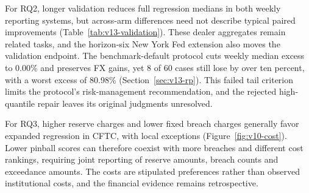 For RQ2, longer validation reduces full regression medians in both weekly reporting systems, but across-arm differences need not describe typical paired improvements (Table~\ref{tab:v13-validation}). These dealer aggregates remain related tasks, and the horizon-six New York Fed extension also moves the validation endpoint. The benchmark-default protocol cuts weekly median excess to 0.00\% and preserves FX gains, yet 8 of 60 cases still lose by over ten percent, with a worst excess of 80.98\% (Section~\ref{sec:v13-rp}). This failed tail criterion limits the protocol's risk-management recommendation, and the rejected high-quantile repair leaves its original judgments unresolved.

For RQ3, higher reserve charges and lower fixed breach charges generally favor expanded regression in CFTC, with local exceptions (Figure~\ref{fig:v10-cost}). Lower pinball scores can therefore coexist with more breaches and different cost rankings, requiring joint reporting of reserve amounts, breach counts and exceedance amounts. The costs are stipulated preferences rather than observed institutional costs, and the financial evidence remains retrospective.

\FloatBarrier

